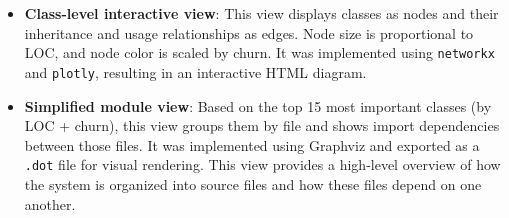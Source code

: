 \begin{itemize}
  \item \textbf{Class-level interactive view}: This view displays classes as nodes and their inheritance and usage relationships as edges. Node size is proportional to LOC, and node color is scaled by churn. It was implemented using \texttt{networkx} and \texttt{plotly}, resulting in an interactive HTML diagram.

  \item \textbf{Simplified module view}: Based on the top 15 most important classes (by LOC + churn), this view groups them by file and shows import dependencies between those files. It was implemented using Graphviz and exported as a \texttt{.dot} file for visual rendering. This view provides a high-level overview of how the system is organized into source files and how these files depend on one another.
\end{itemize}
